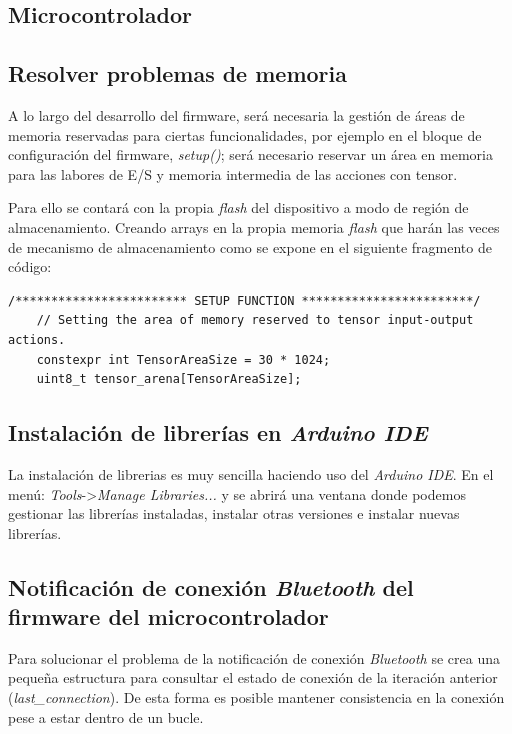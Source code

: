 \appendixpageoff %

\begin{appendices}
\chapter{Microcontrolador}
\section{Resolver problemas de memoria\label{memFlash}}
A lo largo del desarrollo del firmware, será necesaria la gestión de
áreas de memoria reservadas para ciertas funcionalidades, por ejemplo
en el bloque de configuración del firmware, \textit{setup()}; será
necesario reservar un área en memoria para las labores de E/S y memoria
intermedia de las acciones con tensor.

Para ello se contará con la propia \textit{flash}
del dispositivo a modo de región de almacenamiento. Creando arrays en la
propia memoria \textit{flash} que harán las veces de mecanismo de
almacenamiento como se expone en el siguiente fragmento de código:\\

\begin{lstlisting}[firstnumber=62,title=Fragmento de \textit{deep\_pen.ino}]
    /************************ SETUP FUNCTION ************************/
    // Setting the area of memory reserved to tensor input-output actions.
    constexpr int TensorAreaSize = 30 * 1024;
    uint8_t tensor_arena[TensorAreaSize];
\end{lstlisting}


\section{Instalación de librerías en \textit{Arduino IDE}\label{libArduino}}
La instalación de librerias es muy sencilla haciendo uso del
\textit{Arduino IDE}. En el menú: \textit{Tools}->\textit{Manage
Libraries...} y se abrirá una ventana donde podemos gestionar las
librerías instaladas, instalar otras versiones e instalar nuevas
librerías.


\section{Notificación de conexión \textit{Bluetooth} del firmware
del microcontrolador\label{BTcon}}
Para solucionar el problema de la notificación de conexión \textit{Bluetooth}
se crea una pequeña estructura para consultar el estado de conexión de la iteración
anterior (\textit{last\_connection}). De esta forma es posible mantener consistencia
en la conexión pese a estar dentro de un bucle.



\end{appendices}
